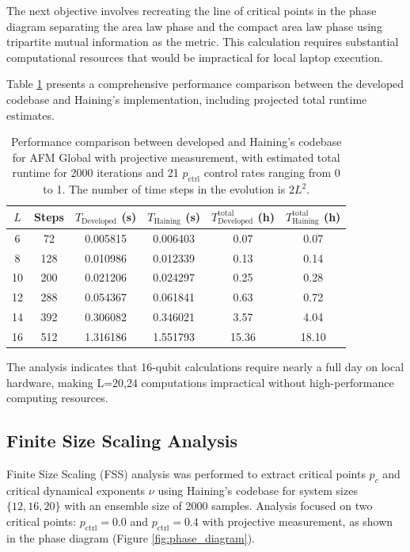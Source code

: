 \documentclass[11pt,a4paper]{article}
\begin{document}
The next objective involves recreating the line of critical points in the phase diagram separating the area law phase and the compact area law phase using tripartite mutual information as the metric. This calculation requires substantial computational resources that would be impractical for local laptop execution.

Table \ref{tab:performance_comparison} presents a comprehensive performance comparison between the developed codebase and Haining's implementation, including projected total runtime estimates.

\begin{table}[h]
\centering
\begin{tabular}{|c|c|c|c|c|c|}
\hline
$L$ & Steps & $T_\text{Developed}$ (s) & $T_\text{Haining}$ (s) & $T_\text{Developed}^{\text{total}}$ (h) & $T_\text{Haining}^{\text{total}}$ (h) \\
\hline
6 & 72 & 0.005815 & 0.006403 & 0.07 & 0.07 \\
\hline
8 & 128 & 0.010986 & 0.012339 & 0.13 & 0.14 \\
\hline
10 & 200 & 0.021206 & 0.024297 & 0.25 & 0.28 \\
\hline
12 & 288 & 0.054367 & 0.061841 & 0.63 & 0.72 \\
\hline
14 & 392 & 0.306082 & 0.346021 & 3.57 & 4.04 \\
\hline
16 & 512 & 1.316186 & 1.551793 & 15.36 & 18.10 \\
\hline
\end{tabular}
\caption{Performance comparison between developed and Haining's codebase for AFM Global with projective measurement, with estimated total runtime for 2000 iterations and 21 $p_\text{ctrl}$ control rates ranging from 0 to 1. The number of time steps in the evolution is $2L^2$.}
\label{tab:performance_comparison}
\end{table}

The analysis indicates that 16-qubit calculations require nearly a full day on local hardware, making L=20,24 computations impractical without high-performance computing resources.

\subsection{Finite Size Scaling Analysis}

Finite Size Scaling (FSS) analysis was performed to extract critical points $p_c$ and critical dynamical exponents $\nu$ using Haining's codebase for system sizes $\{12, 16, 20\}$ with an ensemble size of 2000 samples. Analysis focused on two critical points: $p_\text{ctrl}=0.0$ and $p_\text{ctrl}=0.4$ with projective measurement, as shown in the phase diagram (Figure \ref{fig:phase_diagram}).
\end{document}
